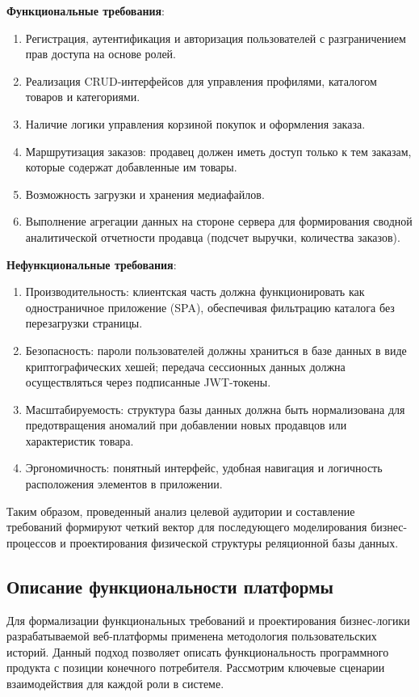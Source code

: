 \textbf{Функциональные требования}:
\begin{enumerate}
    \item Регистрация, аутентификация и авторизация пользователей с разграничением прав доступа на основе ролей.
    \item Реализация CRUD-интерфейсов для управления профилями, каталогом товаров и категориями.
    \item Наличие логики управления корзиной покупок и оформления заказа.
    \item Маршрутизация заказов: продавец должен иметь доступ только к тем заказам, которые содержат добавленные им товары.
    \item Возможность загрузки и хранения медиафайлов.
    \item Выполнение агрегации данных на стороне сервера для формирования сводной аналитической отчетности продавца (подсчет выручки, количества заказов).
\end{enumerate}

\textbf{Нефункциональные требования}:
\begin{enumerate}
    \item Производительность: клиентская часть должна функционировать как одностраничное приложение (SPA), обеспечивая фильтрацию каталога без перезагрузки страницы.
    \item Безопасность: пароли пользователей должны храниться в базе данных в виде криптографических хешей; передача сессионных данных должна осуществляться через подписанные JWT-токены.
    \item Масштабируемость: структура базы данных должна быть нормализована для предотвращения аномалий при добавлении новых продавцов или характеристик товара.
	\item Эргономичность: понятный интерфейс, удобная навигация и логичность расположения элементов в приложении.
\end{enumerate}

Таким образом, проведенный анализ целевой аудитории и составление требований формируют четкий вектор для последующего моделирования бизнес-процессов и 
проектирования физической структуры реляционной базы данных.

\subsection{Описание функциональности платформы}

Для формализации функциональных требований и проектирования бизнес-логики разрабатываемой веб-платформы применена методология пользовательских историй. Данный подход 
позволяет описать функциональность программного продукта с позиции конечного потребителя. Рассмотрим ключевые сценарии взаимодействия для каждой роли в системе.


